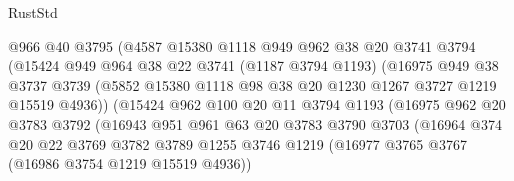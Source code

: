 \begin{lexlean}{RustStd}
\begin{coremodule}
                          @966
                          @40
                          @3795
                          (@4587
                            @15380
                            @1118
                            @949
                            @962
                            @38
                            @20
                            @3741
                            @3794
                            (@15424
                              @949
                              @964
                              @38
                              @22
                              @3741
                              (@1187 @3794 @1193)
                              (@16975
                                @949
                                @38
                                @3737
                                @3739
                                (@5852
                                  @15380
                                  @1118
                                  @98
                                  @38
                                  @20
                                  @1230
                                  @1267
                                  @3727
                                  @1219
                                  @15519
                                  @4936))
                              (@15424
                                @962
                                @100
                                @20
                                @11
                                @3794
                                @1193
                                (@16975
                                  @962
                                  @20
                                  @3783
                                  @3792
                                  (@16943
                                    @951
                                    @961
                                    @63
                                    @20
                                    @3783
                                    @3790
                                    @3703
                                    (@16964
                                      @374
                                      @20
                                      @22
                                      @3769
                                      @3782
                                      @3789
                                      @1255
                                      @3746
                                      @1219
                                      (@16977 @3765 @3767 (@16986 @3754 @1219 @15519 @4936))

\end{coremodule}
\end{lexlean}
